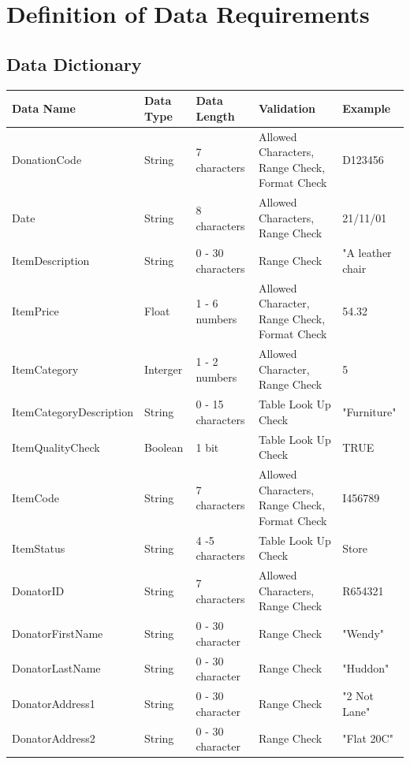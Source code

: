 \section{Definition of Data Requirements}


\subsection{Data Dictionary}

\begin{tabular}{|p{3.25cm}|p{1.5cm}|p{1.75cm}|p{3cm}|p{3.5cm}|}
	\hline
	\textbf{Data Name} & \textbf{Data Type} & \textbf{Data Length} & \textbf{Validation} & \textbf{Example} \\ \hline
	{DonationCode} & {String} & {7 characters} & {Allowed Characters, Range Check, Format Check} & {D123456} \\ \hline
	{Date} & {String} & {8 characters} & {Allowed Characters, Range Check} & {21/11/01} \\ \hline
	{ItemDescription} & {String} & {0 - 30 characters} & {Range Check} & {"A leather chair} \\ \hline
	{ItemPrice} & {Float} & {1 - 6 numbers} & {Allowed Character, Range Check, Format Check} & {54.32} \\ \hline
	{ItemCategory} & {Interger} & {1 - 2 numbers } & {Allowed Character, Range Check} & {5} \\ \hline
	{ItemCategoryDescription} & {String} & {0 - 15 characters} & {Table Look Up Check} & {"Furniture"} \\ \hline
	{ItemQualityCheck} & {Boolean} & {1 bit} & {Table Look Up Check} & {TRUE} \\ \hline
	{ItemCode} & {String} & {7 characters} & {Allowed Characters, Range Check, Format Check} & {I456789} \\ \hline
	{ItemStatus} & {String} & {4 -5 characters} & {Table Look Up Check} & {Store} \\ \hline
	{DonatorID} & {String} & {7 characters} & {Allowed Characters, Range Check} & {R654321} \\ \hline
	{DonatorFirstName} & {String} & {0 - 30 character} & {Range Check} & {"Wendy"} \\ \hline
	{DonatorLastName} & {String} & {0 - 30 character} & {Range Check} & {"Huddon"} \\ \hline
	{DonatorAddress1} & {String} & {0 - 30 character} & {Range Check} & {"2 Not Lane"} \\ \hline
	{DonatorAddress2} & {String} & {0 - 30 character} & {Range Check} & {"Flat 20C"} \\ \hline

\end{tabular}
